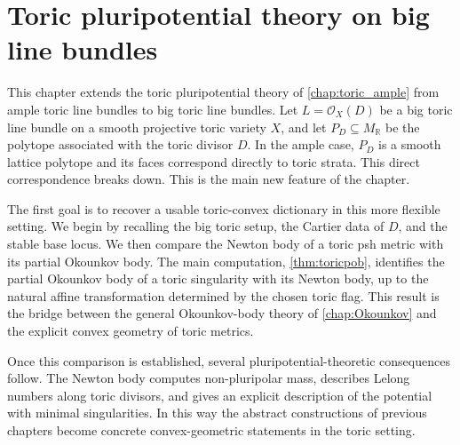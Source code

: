 \chapter{Toric pluripotential theory on big line bundles}
\label{chap:toric_big}

This chapter extends the toric pluripotential theory of \cref{chap:toric_ample} from ample toric line bundles to big toric line bundles. Let $L=\mathcal O_X(D)$ be a big toric line bundle on a smooth projective toric variety $X$, and let $P_D\subseteq M_{\mathbb R}$ be the polytope associated with the toric divisor $D$. In the ample case, $P_D$ is a smooth lattice polytope and its faces correspond directly to toric strata. This direct correspondence breaks down. This is the main new feature of the chapter.

The first goal is to recover a usable toric-convex dictionary in this more flexible setting. We begin by recalling the big toric setup, the Cartier data of $D$, and the stable base locus. We then compare the Newton body of a toric psh metric with its partial Okounkov body. The main computation, \cref{thm:toricpob}, identifies the partial Okounkov body of a toric singularity with its Newton body, up to the natural affine transformation determined by the chosen toric flag. This result is the bridge between the general Okounkov-body theory of \cref{chap:Okounkov} and the explicit convex geometry of toric metrics.

Once this comparison is established, several pluripotential-theoretic consequences follow. The Newton body computes non-pluripolar mass, describes Lelong numbers along toric divisors, and gives an explicit description of the potential with minimal singularities. In this way the abstract constructions of previous chapters become concrete convex-geometric statements in the toric setting.


